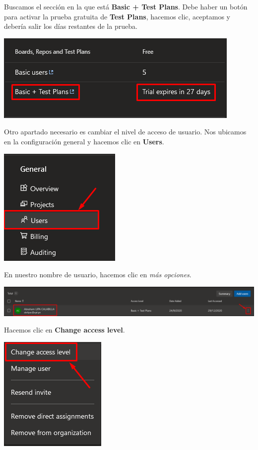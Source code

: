 \documentclass{elsarticle}
\begin{document}
Buscamos el sección en la que está \textbf{Basic + Test Plans}. Debe haber un botón para activar la prueba gratuita de \textbf{Test Plans}, hacemos clic, aceptamos y debería salir los días restantes de la prueba.
\begin{center}
	\includegraphics{img/Screenshot_3.png}
\end{center}

Otro apartado necesario es cambiar el nivel de acceso de usuario. Nos ubicamos en la configuración general y hacemos clic en \textbf{Users}.
\begin{center}
	\includegraphics{img/Screenshot_4.png}
\end{center}

En nuestro nombre de usuario, hacemos clic en \textit{más opciones}.
\begin{center}
	\includegraphics[width=\columnwidth]{img/Screenshot_5.png}
\end{center}

Hacemos clic en \textbf{Change access level}.
\begin{center}
	\includegraphics{img/Screenshot_6.png}
\end{center}
\end{document}
